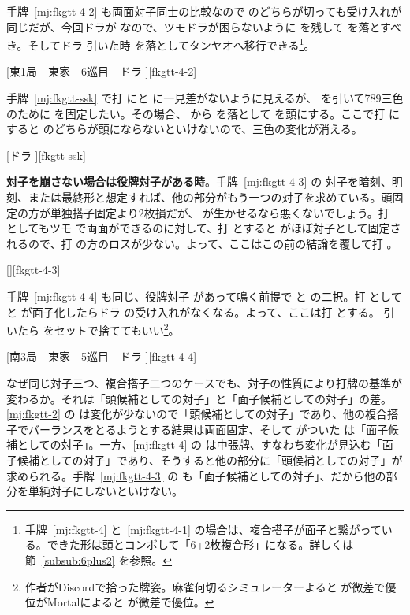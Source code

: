 \documentclass[../nankiru_main.tex]{subfiles}
\begin{document}
手牌~\ref{mj:fkgtt-4-2} も両面対子同士の比較なので  のどちらが切っても受け入れが同じだが、今回ドラが  なので、ツモドラが困らないように  を残して  を落とすべき。そしてドラ  引いた時  を落としてタンヤオへ移行できる\citep[][p.~24]{uzaku-nankiru}\footnote{手牌~\ref{mj:fkgtt-4} と~\ref{mj:fkgtt-4-1} の場合は、複合搭子が面子と繋がっている。できた形は頭とコンボして「6+2枚複合形」になる。詳しくは節~\ref{subsub:6plus2} を参照。}。

[東1局　東家　6巡目　ドラ ][fkgtt-4-2]

手牌~\ref{mj:fkgtt-ssk} で打  にと  に一見差がないように見えるが、 を引いて789三色のために  を固定したい。その場合、 から  を落として  を頭にする。ここで打  にすると  のどちらが頭にならないといけないので、三色の変化が消える\citep{nemata-16}。

[ドラ ][fkgtt-ssk]

\textbf{対子を崩さない場合は役牌対子がある時}\citep[][p.~72]{uzaku-haikouritsu}。手牌~\ref{mj:fkgtt-4-3} の  対子を暗刻、明刻、または最終形と想定すれば、他の部分がもう一つの対子を求めている。頭固定の方が単独搭子固定より2枚損だが、 が生かせるなら悪くないでしょう。打  としてもツモ  で両面ができるのに対して、打  とすると  がほぼ対子として固定されるので、打  の方のロスが少ない。よって、ここはこの前の結論を覆して打 。

[][fkgtt-4-3]

手牌~\ref{mj:fkgtt-4-4} も同じ、役牌対子  があって鳴く前提で  と  の二択。打  として  と  が面子化したらドラ  の受け入れがなくなる。よって、ここは打  とする。 引いたら  をセットで捨ててもいい\footnote{作者がDiscordで拾った牌姿。麻雀何切るシミュレーターよると  が微差で優位がMortalによると  が微差で優位。}。

[南3局　東家　5巡目　ドラ ][fkgtt-4-4]

なぜ同じ対子三つ、複合搭子二つのケースでも、対子の性質により打牌の基準が変わるか。それは「頭候補としての対子」と「面子候補としての対子」の差。\ref{mj:fkgtt-2} の  は変化が少ないので「頭候補としての対子」であり、他の複合搭子でバーランスをとるようとする結果は両面固定、そして  がついた  は「面子候補としての対子」。一方、\ref{mj:fkgtt-4} の  は中張牌、すなわち変化が見込む「面子候補としての対子」であり、そうすると他の部分に「頭候補としての対子」が求められる。手牌~\ref{mj:fkgtt-4-3} の  も「面子候補としての対子」、だから他の部分を単純対子にしないといけない。
\end{document}
